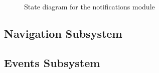 \documentclass{article}
\begin{document}
			\begin{figure}[H]
			
				\caption{State diagram for the notifications module}
			
			\end{figure}
	
		\subsection{Navigation Subsystem}
	
		\subsection{Events Subsystem}
		
\end{document}
